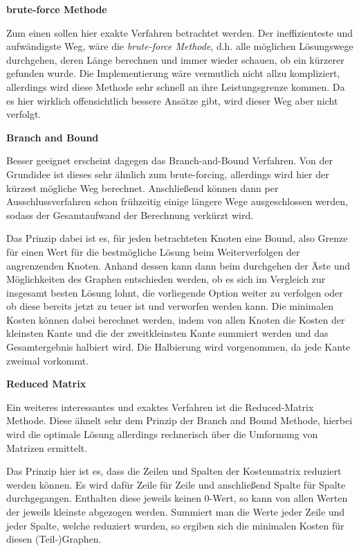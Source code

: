 \textbf{brute-force Methode}

Zum einen sollen hier exakte Verfahren betrachtet werden. Der ineffizienteste und aufwändigste Weg, wäre die \textit{brute-force Methode}, d.h. alle möglichen Lösungswege durchgehen, deren Länge berechnen und immer wieder schauen, ob ein kürzerer gefunden wurde. Die Implementierung wäre vermutlich nicht allzu kompliziert, allerdings wird diese Methode sehr schnell an ihre Leistungsgrenze kommen. Da es hier wirklich offensichtlich bessere Ansätze gibt, wird dieser Weg aber nicht verfolgt. \cite{oracleTsp}

\textbf{Branch and Bound}

Besser geeignet erscheint dagegen das Branch-and-Bound Verfahren. Von der Grundidee ist dieses sehr ähnlich zum brute-forcing, allerdings wird hier der kürzest mögliche Weg berechnet. Anschließend können dann per Ausschlussverfahren schon frühzeitig einige längere Wege ausgeschlossen werden, sodass der Gesamtaufwand der Berechnung verkürzt wird. \cite{travelingSalesman}

Das Prinzip dabei ist es, für jeden betrachteten Knoten eine \glqq{}Bound\grqq{}, also Grenze für einen Wert für die bestmögliche Lösung beim Weiterverfolgen der angrenzenden Knoten. Anhand dessen kann dann beim durchgehen der Äste und Möglichkeiten des Graphen entschieden werden, ob es sich im Vergleich zur insgesamt besten Lösung lohnt, die vorliegende Option weiter zu verfolgen oder ob diese bereits jetzt zu teuer ist und verworfen werden kann. Die minimalen Kosten können dabei berechnet werden, indem von allen Knoten die Kosten der kleinsten Kante und die der zweitkleinsten Kante summiert werden und das Gesamtergebnis halbiert wird. Die Halbierung wird vorgenommen, da jede Kante zweimal vorkommt. \cite{geeksForGeeksBnB}

\textbf{Reduced Matrix}

Ein weiteres interessantes und exaktes Verfahren ist die Reduced-Matrix Methode. Diese ähnelt sehr dem Prinzip der Branch and Bound Methode, hierbei wird die optimale Lösung allerdings rechnerisch über die Umformung von Matrizen ermittelt. 

Das Prinzip hier ist es, dass die Zeilen und Spalten der Kostenmatrix reduziert werden können. Es wird dafür Zeile für Zeile und anschließend Spalte für Spalte durchgegangen. Enthalten diese jeweils keinen 0-Wert, so kann von allen Werten der jeweils kleinste abgezogen werden. Summiert man die Werte jeder Zeile und jeder Spalte, welche reduziert wurden, so ergiben sich die minimalen Kosten für diesen (Teil-)Graphen. \cite{geeksForGeeksRm}

